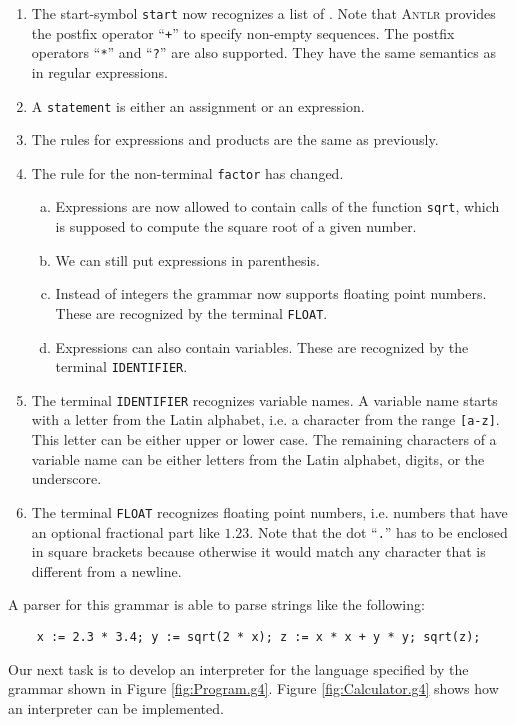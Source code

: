 \begin{enumerate}
\item The start-symbol \texttt{start} now recognizes a list of .
      Note that \textsc{Antlr} provides the postfix operator ``\texttt{+}'' to
      specify non-empty sequences.  The postfix operators ``\texttt{*}'' and ``\texttt{?}'' are also 
      supported.  They have the same semantics as in regular expressions.
\item A \texttt{statement} is either an assignment or an expression. 
\item The rules for expressions and products are the same as previously.
\item The rule for the non-terminal \texttt{factor} has changed.
      \begin{enumerate}[(a)]
      \item Expressions are now allowed to contain calls of the function \texttt{sqrt},
            which is supposed to compute the square root of a given number.
      \item We can still put expressions in parenthesis.
      \item Instead of integers the grammar now supports floating point numbers.
            These are recognized by the terminal \texttt{FLOAT}.
      \item Expressions can also contain variables.  These are recognized by the terminal
            \texttt{IDENTIFIER}.
      \end{enumerate}
\item The terminal \texttt{IDENTIFIER} recognizes variable names.  A variable name starts with 
      a letter from the Latin alphabet, i.e. a character from the range \texttt{[a-z]}.  This letter can be either
      upper or lower case.  The remaining characters of a variable name can be either letters from the Latin
      alphabet, digits, or the underscore.
\item The terminal \texttt{FLOAT} recognizes floating point numbers, i.e. numbers that have an optional
      fractional part like $1.23$.  Note that the dot ``\texttt{.}'' has to be enclosed in square
      brackets because otherwise it would match any character that is different from a newline.  
\end{enumerate}
A parser for this grammar is able to parse strings like the following:
\begin{verbatim}
    x := 2.3 * 3.4; y := sqrt(2 * x); z := x * x + y * y; sqrt(z);
\end{verbatim}
Our next task is to develop an interpreter for the language specified by the grammar shown 
in Figure \ref{fig:Program.g4}.  Figure \ref{fig:Calculator.g4} shows how an interpreter can be implemented.



